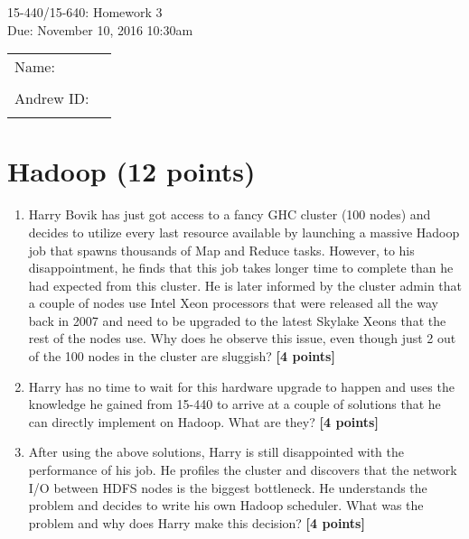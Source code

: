 \documentclass{article}
\newcommand{\mycoursenum}{15-440/15-640}
\newcommand{\myhwnum}{3}
\newcommand{\myname}{}   %
\newcommand{\myandrew}{}  %
\begin{document}
\medskip
\thispagestyle{plain}
\begin{center}
{\Large \mycoursenum: Homework \myhwnum}\\
Due: November 10, 2016 10:30am \\
\medskip
\begin{tabular}{| l p{3in}|}
\hline
Name: \myname& \\
& \\ \hline
Andrew ID: \myandrew & \\
&\\
\hline
\end{tabular}
\end{center}




\section{Hadoop (12 points)}
\begin{enumerate}
\item Harry Bovik has just got access to a fancy GHC cluster (100 nodes) and decides to utilize every last resource available by launching a massive Hadoop job that spawns thousands of Map and Reduce tasks. However, to his disappointment, he finds that this job takes longer time to complete than he had expected from this cluster. He is later informed by the cluster admin that a couple of nodes use Intel Xeon processors that were released all the way back in 2007 and need to be upgraded to the latest Skylake Xeons that the rest of the nodes use. Why does he observe this issue, even though just 2 out of the 100 nodes in the cluster are sluggish? \textbf{[4 points]}

\item Harry has no time to wait for this hardware upgrade to happen and uses the knowledge he gained from 15-440 to arrive at a couple of solutions that he can directly implement on Hadoop. What are they? \textbf{[4 points]}

\item After using the above solutions, Harry is still disappointed with the performance of his job. He profiles the cluster and discovers that the network I/O between HDFS nodes is the biggest bottleneck. He understands the problem and decides to write his own Hadoop scheduler. What was the problem and why does Harry make this decision? \textbf{[4 points]}

\end{enumerate}
\end{document}
